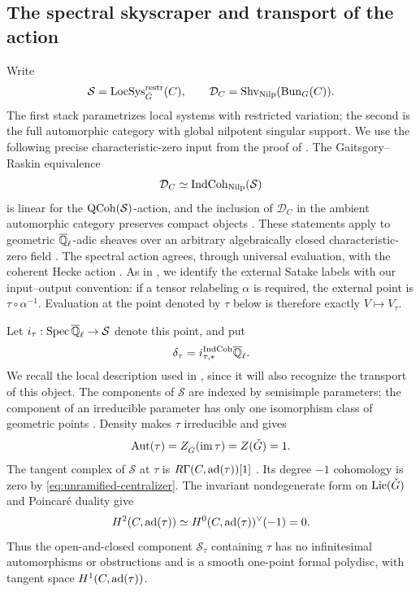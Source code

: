 \subsection{The spectral skyscraper and transport of the action}

Write
\[
 \mathcal S=\operatorname{LocSys}_{\check G}^{\mathrm{restr}}(C),\qquad
 \mathcal D_C=\operatorname{Shv}_{\mathrm{Nilp}}(\operatorname{Bun}_G(C)).
\]
The first stack parametrizes local systems with restricted variation;
the second is the full automorphic category with global nilpotent
singular support.  We use the following precise characteristic-zero
input from the proof of \cite[Lemma~8.1]{CT}.  The Gaitsgory--Raskin
equivalence
\begin{equation}\label{eq:unramified-equivalence}
 \mathcal D_C\simeq\operatorname{IndCoh}_{\mathrm{Nilp}}(\mathcal S)
\end{equation}
is linear for the $\operatorname{QCoh}(\mathcal S)$-action, and the inclusion of
$\mathcal D_C$ in the ambient automorphic category preserves compact
objects \cite[Main Theorem~1.3.9(ii), Lemma~1.3.7, and Theorem~1.1.7]{GR}.
These statements apply to geometric $\overline{\mathbb Q}_{\ell}$-adic sheaves over an arbitrary
algebraically closed characteristic-zero field
\cite[Section~2.3]{GR}.  The spectral action agrees, through universal
evaluation, with the coherent Hecke action
\cite[Main Theorem~14.3.2 and Section~14.3.3]{AGKRRV}.
As in \cite[Lemma~8.1]{CT}, we identify the external Satake labels with
our input--output convention: if a tensor relabeling $\alpha$ is required,
the external point is $\tau\circ\alpha^{-1}$.  Evaluation at the point
denoted by $\tau$ below is therefore exactly $V\mapsto V_\tau$.

Let $i_\tau:\operatorname{Spec}\overline{\mathbb Q}_{\ell}\to\mathcal S$ denote this point, and put
\[
       \delta_\tau=i_{\tau,*}^{\operatorname{IndCoh}}\overline{\mathbb Q}_{\ell}.
\]
We recall the local description used in \cite[Lemma~8.1]{CT}, since it
will also recognize the transport of this object.  The components of
$\mathcal S$ are indexed by semisimple parameters; the component of an
irreducible parameter has only one isomorphism class of geometric points
\cite[Proposition~3.7.2 and Corollary~3.7.5]{AGKRRV}.  Density makes $\tau$
irreducible and gives
\begin{equation}\label{eq:unramified-centralizer}
 \operatorname{Aut}(\tau)=Z_{\check G}(\operatorname{im}\tau)=Z(\check G)=1.
\end{equation}
The tangent complex of $\mathcal S$ at $\tau$ is
$R\Gamma(C,\operatorname{ad}(\tau))[1]$
\cite[Section~21.2.1]{AGKRRV}.  Its degree $-1$ cohomology is zero by
\eqref{eq:unramified-centralizer}.  The invariant nondegenerate form on
$\operatorname{Lie}(\check G)$ and Poincar\'e duality give
\[
 H^2(C,\operatorname{ad}(\tau))
       \simeq H^0(C,\operatorname{ad}(\tau))^\vee(-1)=0.
\]
Thus the open-and-closed component $\mathcal S_\tau$ containing $\tau$
has no infinitesimal automorphisms or obstructions and is a smooth
one-point formal polydisc, with tangent space $H^1(C,\operatorname{ad}(\tau))$.

